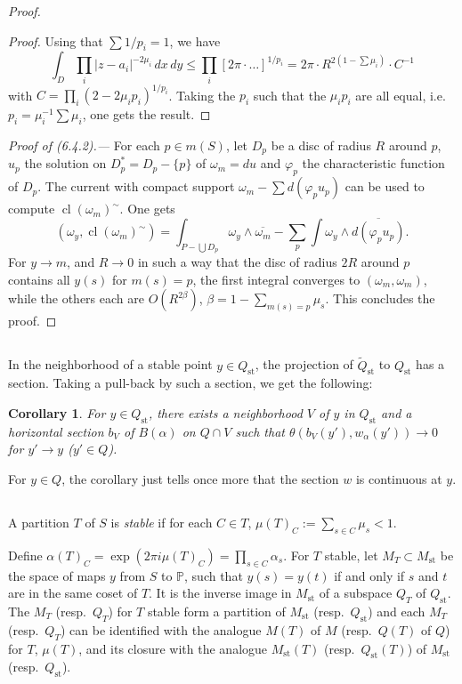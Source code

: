 \documentclass[12pt,a4paper]{article}
\theoremstyle{plain}
\newtheorem{corollary}[theorem]{Corollary}
\theoremstyle{definition}
\theoremstyle{remark}
\newcommand{\PP}{\mathbb{P}}
\numberwithin{equation}{section}
\providecommand{\PP}{\mathbb{P}}
\providecommand{\cl}{\operatorname{cl}}
\begin{document}
\begin{proof}
\begin{proof}
Using that $\sum 1/p_i = 1$, we have
\[
\int_D \prod_i |z - a_i|^{-2\mu_i} \, dx \, dy \leq \prod_i [2\pi \cdot \ldots]^{1/p_i} = 2\pi \cdot R^{2(1 - \sum \mu_i)} \cdot C^{-1}
\]
with $C = \prod_i (2 - 2\mu_i p_i)^{1/p_i}$. Taking the $p_i$ such that the $\mu_i p_i$ are all equal, i.e.\ $p_i = \mu_i^{-1} \sum \mu_i$, one gets the result.
\end{proof}

\textit{Proof of (6.4.2).---} For each $p \in m(S)$, let $D_p$ be a disc of radius $R$ around $p$, $u_p$ the solution on $D_p^* = D_p - \{p\}$ of $\omega_m = du$ and $\varphi_p$ the characteristic function of $D_p$. The current with compact support $\omega_m - \sum d(\varphi_p u_p)$ can be used to compute $\cl(\omega_m)^\sim$. One gets
\[
(\omega_y, \cl(\omega_m)^\sim) = \int_{P - \bigcup D_p} \omega_y \wedge \overline{\omega_m} - \sum_p \int \omega_y \wedge \overline{d(\varphi_p u_p)}.
\]
For $y \to m$, and $R \to 0$ in such a way that the disc of radius $2R$ around $p$ contains all $y(s)$ for $m(s) = p$, the first integral converges to $(\omega_m, \omega_m)$, while the others each are $O(R^{2\beta})$, $\beta = 1 - \sum_{m(s)=p} \mu_s$. This concludes the proof.
\end{proof}

\subsection{}
In the neighborhood of a stable point $y \in Q_{\mathrm{st}}$, the projection of $\widetilde{Q}_{\mathrm{st}}$ to $Q_{\mathrm{st}}$ has a section. Taking a pull-back by such a section, we get the following:

\begin{corollary}\label{cor:6.8}
For $y \in Q_{\mathrm{st}}$, there exists a neighborhood $V$ of $y$ in $Q_{\mathrm{st}}$ and a horizontal section $b_V$ of $B(\alpha)$ on $Q \cap V$ such that $\theta(b_V(y'), w_\alpha(y')) \to 0$ for $y' \to y$ ($y' \in Q$).
\end{corollary}

For $y \in Q$, the corollary just tells once more that the section $w$ is continuous at $y$.

\subsection{}
A partition $T$ of $S$ is \emph{stable} if for each $C \in T$, $\mu(T)_C := \sum_{s \in C} \mu_s < 1$.

Define $\alpha(T)_C = \exp(2\pi i \mu(T)_C) = \prod_{s \in C} \alpha_s$. For $T$ stable, let $M_T \subset M_{\mathrm{st}}$ be the space of maps $y$ from $S$ to $\PP$, such that $y(s) = y(t)$ if and only if $s$ and $t$ are in the same coset of $T$. It is the inverse image in $M_{\mathrm{st}}$ of a subspace $Q_T$ of $Q_{\mathrm{st}}$. The $M_T$ (resp.\ $Q_T$) for $T$ stable form a partition of $M_{\mathrm{st}}$ (resp.\ $Q_{\mathrm{st}}$) and each $M_T$ (resp.\ $Q_T$) can be identified with the analogue $M(T)$ of $M$ (resp.\ $Q(T)$ of $Q$) for $T$, $\mu(T)$, and its closure with the analogue $M_{\mathrm{st}}(T)$ (resp.\ $Q_{\mathrm{st}}(T)$) of $M_{\mathrm{st}}$ (resp.\ $Q_{\mathrm{st}}$).
\end{document}
